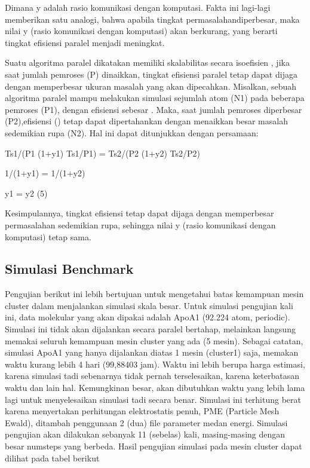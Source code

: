 \documentclass[aps,showpacs,pre,floatfix]{revtex4}
\begin{document}
Dimana y adalah rasio komunikasi dengan komputasi. Fakta ini
lagi-lagi memberikan satu analogi, bahwa apabila tingkat
permasalahandiperbesar, maka nilai y (rasio komunikasi dengan
komputasi) akan berkurang, yang berarti tingkat efisiensi paralel
menjadi meningkat.

Suatu algoritma paralel dikatakan memiliki skalabilitas secara
isoefisien , jika saat jumlah pemroses (P) dinaikkan, tingkat
efisiensi paralel tetap dapat dijaga dengan memperbesar ukuran
masalah yang akan dipecahkan. Misalkan, sebuah algoritma paralel
mampu melakukan simulasi sejumlah atom (N1) pada beberapa pemroses
(P1), dengan efisiensi sebesar
. Maka, saat jumlah pemroses diperbesar
(P2),efisiensi () tetap dapat
dipertahankan dengan menaikkan besar masalah sedemikian rupa (N2).
Hal ini dapat ditunjukkan dengan persamaan:

\begin{center}
{\footnotesize Ts1/(P1 (1+y1) Ts1/P1) = Ts2/(P2 (1+y2) Ts2/P2)}
\end{center}
\begin{center}
{\footnotesize 1/(1+y1) = 1/(1+y2)}
\end{center}
\begin{center}
{\footnotesize y1 = y2 (5)}
\end{center}

Kesimpulannya, tingkat efisiensi tetap dapat dijaga dengan
memperbesar permasalahan sedemikian rupa, sehingga nilai y (rasio
komunikasi dengan komputasi) tetap sama.

\subsection{Simulasi Benchmark}

Pengujian berikut ini lebih bertujuan untuk mengetahui batas
kemampuan mesin cluster dalam menjalankan simulasi skala besar.
Untuk simulasi pengujian kali ini, data molekular yang akan
dipakai adalah ApoA1 (92.224 atom, periodic). Simulasi ini tidak
akan dijalankan secara paralel bertahap, melainkan langsung
memakai seluruh kemampuan mesin cluster yang ada (5 mesin).
Sebagai catatan, simulasi ApoA1 yang hanya dijalankan diatas 1
mesin (cluster1) saja, memakan waktu kurang lebih 4 hari (99,88403
jam). Waktu ini lebih berupa harga estimasi, karena simulasi tadi
sebenarnya tidak pernah terselesaikan, karena keterbatasan waktu
dan lain hal. Kemungkinan besar, akan dibutuhkan waktu yang lebih
lama lagi untuk menyelesaikan simulasi tadi secara benar. Simulasi
ini terhitung berat karena menyertakan perhitungan elektrostatis
penuh, PME (Particle Mesh Ewald), ditambah penggunaan 2 (dua) file
parameter medan energi. Simulasi pengujian akan dilakukan sebanyak
11 (sebelas) kali, masing-masing dengan besar numsteps yang
berbeda. Hasil pengujian simulasi pada mesin cluster dapat dilihat
pada tabel berikut
\end{document}
